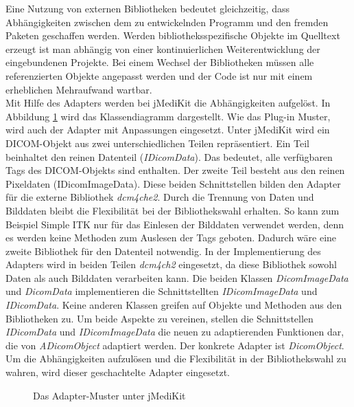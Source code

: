 Eine Nutzung von externen Bibliotheken bedeutet gleichzeitig, dass Abhängigkeiten zwischen dem zu entwickelnden Programm und den fremden Paketen geschaffen werden. Werden bibliotheksspezifische Objekte im Quelltext erzeugt ist man abhängig von einer kontinuierlichen Weiterentwicklung der eingebundenen Projekte. Bei einem Wechsel der Bibliotheken müssen alle referenzierten Objekte angepasst werden und der Code ist nur mit einem erheblichen Mehraufwand wartbar.\\
Mit Hilfe des Adapters werden bei jMediKit die Abhängigkeiten aufgelöst. In Abbildung \ref{dicomo} wird das Klassendiagramm dargestellt. Wie das Plug-in Muster, wird auch der Adapter mit Anpassungen eingesetzt. Unter jMediKit wird ein DICOM-Objekt aus zwei unterschiedlichen Teilen repräsentiert. Ein Teil beinhaltet den reinen Datenteil (\textit{IDicomData}). Das bedeutet, alle verfügbaren Tags des DICOM-Objekts sind enthalten. Der zweite Teil besteht aus den reinen Pixeldaten (IDicomImageData). Diese beiden Schnittstellen bilden den Adapter für die externe Bibliothek \textit{dcm4che2}. Durch die Trennung von Daten und Bilddaten bleibt die Flexibilität bei der Bibliothekswahl erhalten. So kann zum Beispiel Simple ITK nur für das Einlesen der Bilddaten verwendet werden, denn es werden keine Methoden zum Auslesen der Tags geboten. Dadurch wäre eine zweite Bibliothek für den Datenteil notwendig. In der Implementierung des Adapters wird in beiden Teilen \textit{dcm4ch2} eingesetzt, da diese Bibliothek sowohl Daten als auch Bilddaten verarbeiten kann. Die beiden Klassen \textit{DicomImageData} und \textit{DicomData} implementieren die Schnittstellten \textit{IDicomImageData} und \textit{IDicomData}. Keine anderen Klassen greifen auf Objekte und Methoden aus den Bibliotheken zu.
Um beide Aspekte zu vereinen, stellen die Schnittstellen \textit{IDicomData} und \textit{IDicomImageData} die neuen zu adaptierenden Funktionen dar, die von \textit{ADicomObject} adaptiert werden. Der konkrete Adapter ist \textit{DicomObject}. Um die Abhängigkeiten aufzulösen und die Flexibilität in der Bibliothekswahl zu wahren, wird dieser geschachtelte Adapter eingesetzt.

\begin{figure}[htbp]
  \vspace{0.5cm}
  \centering
  \caption{Das Adapter-Muster unter jMediKit}
  \label{dicomo}
  \vspace{0.5cm}
\end{figure}

